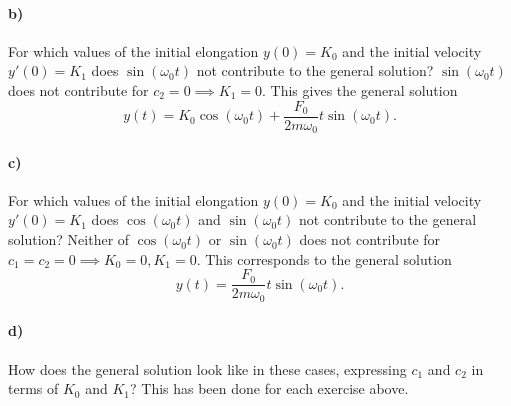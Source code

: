 \paragraph{b)} For which values of the initial elongation $y(0) = K_0$ and the initial velocity $y'(0) = K_1$ does $\sin(\omega_0 t)$ not contribute to the general solution? 
\bigbreak
$\sin(\omega_0 t)$ does not contribute for $c_2 = 0 \implies K_1 = 0$. This gives the general solution
\[ 
y(t) = K_0 \cos (\omega_0 t) + \frac{F_0}{2 m \omega_0} t \sin (\omega_0 t)
.\]

\paragraph{c)} For which values of the initial elongation $y(0) = K_0$ and the initial velocity $y'(0) = K_1$ does $\cos (\omega_0 t)$ and $\sin (\omega_0 t)$ not contribute to the general solution?
\bigbreak
Neither of $\cos(\omega_0 t)$ or $\sin(\omega_0 t)$ does not contribute for $c_1 = c_2 = 0 \implies K_0 = 0, K_1 = 0$. This corresponds to the general solution
\[ 
y(t) = \frac{F_0}{2 m \omega_0} t \sin (\omega_0 t)
.\]


\paragraph{d)} How does the general solution look like in these cases, expressing $c_1$ and $c_2$ in terms of $K_0$ and $K_1$?
\bigbreak
This has been done for each exercise above.

